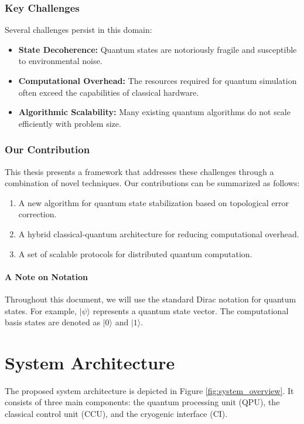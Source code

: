 \subsubsection{Key Challenges}
Several challenges persist in this domain:
\begin{itemize}
    \item \textbf{State Decoherence:} Quantum states are notoriously fragile and susceptible to environmental noise.
    \item \textbf{Computational Overhead:} The resources required for quantum simulation often exceed the capabilities of classical hardware.
    \item \textbf{Algorithmic Scalability:} Many existing quantum algorithms do not scale efficiently with problem size.
\end{itemize}

\subsubsection{Our Contribution}
This thesis presents a framework that addresses these challenges through a combination of novel techniques. Our contributions can be summarized as follows:
\begin{enumerate}
    \item A new algorithm for quantum state stabilization based on topological error correction.
    \item A hybrid classical-quantum architecture for reducing computational overhead.
    \item A set of scalable protocols for distributed quantum computation.
\end{enumerate}

\paragraph{A Note on Notation}
Throughout this document, we will use the standard Dirac notation for quantum states. For example, $|\psi\rangle$ represents a quantum state vector. The computational basis states are denoted as $|0\rangle$ and $|1\rangle$.

\section{System Architecture}
The proposed system architecture is depicted in Figure \ref{fig:system_overview}. It consists of three main components: the quantum processing unit (QPU), the classical control unit (CCU), and the cryogenic interface (CI).

